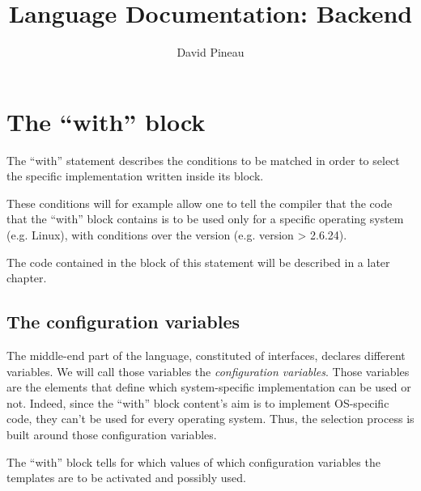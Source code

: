 \documentclass[american]{rtxreport}
\author{David Pineau}
\title{Language Documentation: Backend}
\begin{document}
\maketitle

\rtxmaketitleblock

\tableofcontents


\chapter{The “with” block}

The “with” statement describes the conditions to be matched in order to select
the specific implementation written inside its block.

These conditions will for example allow one to tell the compiler that the code
that the “with” block contains is to be used only for a specific operating
system (e.g. Linux), with conditions over the version (e.g. version > 2.6.24).

The code contained in the block of this statement will be described in a later
chapter.

\section{The configuration variables}

The middle-end part of the language, constituted of interfaces, declares
different variables. We will call those variables the \emph{configuration
variables}. Those variables are the elements that define which system-specific
implementation can be used or not. Indeed, since the “with” block content's aim
is to implement OS-specific code, they can't be used for every operating system.
Thus, the selection process is built around those configuration variables.

The “with” block tells for which values of which configuration variables the
templates are to be activated and possibly used.  
\end{document}
